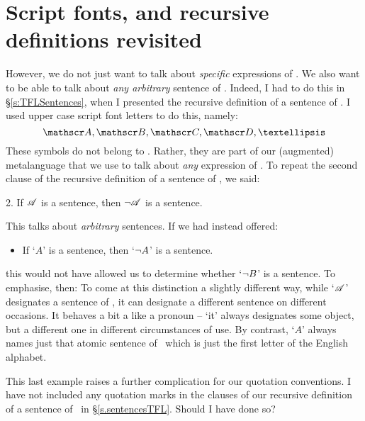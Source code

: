 \section{Script fonts, and recursive definitions revisited}
However, we do not just want to talk about \emph{specific} expressions of \TFL. We also want to be able to talk about \emph{any arbitrary} sentence of \TFL. Indeed, I had to do this in §\ref{s:TFLSentences}, when I presented the recursive definition of a sentence of \TFL. I used upper case script font letters to do this, namely:
	$$\meta{A}, \meta{B}, \meta{C}, \meta{D}, …$$
These symbols do not belong to \TFL. Rather, they are part of our (augmented) metalanguage that we use to talk about \emph{any} expression of \TFL. To repeat the second clause of the recursive definition of a sentence of \TFL, we said:
	\begin{earg}
		\item[2.] If $\mathscr{A}$ is a sentence, then $\neg \mathscr{A}$ is a sentence.
	\end{earg}
This talks about \emph{arbitrary} sentences. If we had instead offered:
	\begin{itemize}
		\item If `$A$' is a sentence, then `$\neg A$' is a sentence.
	\end{itemize}
this would not have allowed us to determine whether `$\neg B$' is a sentence. To emphasise, then:
To come at this distinction a slightly different way, while `$\mathscr{A}$' designates a sentence of \TFL, it can designate a different sentence on different occasions. It behaves a bit a like a pronoun – `it' always designates some object, but a different one in different circumstances of use. By contrast, `$A$' always names just that atomic sentence of \TFL\ which is just the first letter of the English alphabet.  

This last example raises a further complication for our quotation conventions. I have not included any quotation marks in the clauses of our recursive definition of a sentence of \TFL\ in §\ref{s.sentencesTFL}. Should I have done so?

